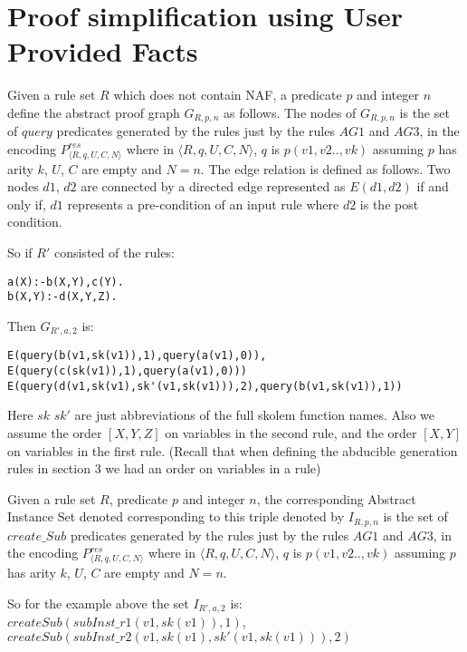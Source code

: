 \section{Proof simplification using User Provided Facts}\label{sec:proof_simplification}
\begin{definition}
Given a rule set $R$ which does not contain NAF, a predicate $p$ and integer $n$ define the abstract proof graph
$G_{R,p,n}$ as follows. The nodes of $G_{R,p,n}$ is the set of $query$
predicates generated by the rules just by the rules $AG1$ and $AG3$, in the encoding $P_{\langle R,q,U,C,N\rangle}^{res}$ where in
$\langle R,q,U,C,N\rangle$, $q$ is $p(v1,v2..,vk)$ assuming $p$ has arity $k$,
$U$, $C$ are empty and $N = n$. The edge relation is defined as follows. Two
nodes $d1$, $d2$ are connected by a directed edge represented as $E(d1,d2)$ if
and only if, $d1$ represents a pre-condition of an input rule where $d2$ is
the post condition.
\end{definition}
So if $R'$ consisted of the rules:
\begin{lstlisting}[frame=none]
a(X):-b(X,Y),c(Y).
b(X,Y):-d(X,Y,Z).
\end{lstlisting}
Then $G_{R',a,2}$ is:
\begin{lstlisting}[frame=none]
E(query(b(v1,sk(v1)),1),query(a(v1),0)),
E(query(c(sk(v1)),1),query(a(v1),0)))
E(query(d(v1,sk(v1),sk'(v1,sk(v1))),2),query(b(v1,sk(v1)),1))
\end{lstlisting}
Here $sk$ $sk'$ are just abbreviations of the full skolem function names. Also we assume the order $[X,Y,Z]$ on variables in the second rule, and the order $[X,Y]$ on variables in the first rule. (Recall that when defining the abducible generation rules in section 3 we had an order on variables in a rule)
\begin{definition}\label{absinst}
Given a rule set $R$, predicate $p$ and integer $n$, the corresponding Abstract Instance Set denoted corresponding to this triple denoted by  $I_{R,p,n}$ is the set of $create\_Sub$
predicates generated by the rules just by the rules $AG1$ and $AG3$, in the encoding $P_{\langle R,q,U,C,N\rangle}^{res}$ where in
$\langle R,q,U,C,N\rangle$, $q$ is $p(v1,v2..,vk)$ assuming $p$ has arity $k$,
$U$, $C$ are empty and $N = n$. 
\end{definition}
So for the example above the set $I_{R',a,2}$ is:\\ $createSub(subInst\_r1(v1,sk(v1)),1)$,\\ $createSub(subInst\_r2(v1,sk(v1), sk'(v1,sk(v1))),2)$ 

